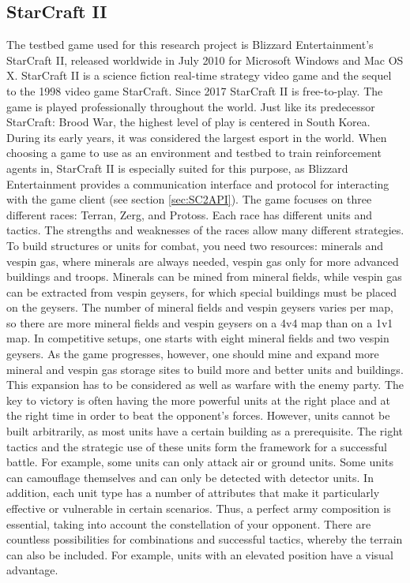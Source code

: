 \documentclass[12pt,a4paper]{article}
\begin{document}
\subsection{StarCraft II}\label{sec:SC2}
The testbed game used for this research project is Blizzard Entertainment's StarCraft II, released worldwide in July 2010 for Microsoft Windows and Mac OS X. StarCraft II is a science fiction real-time strategy video game and the sequel to the 1998 video game StarCraft. Since 2017 StarCraft II is free-to-play. The game is played professionally throughout the world. Just like its predecessor StarCraft: Brood War, the highest level of play is centered in South Korea. During its early years, it was considered the largest esport in the world.
When choosing a game to use as an environment and testbed to train reinforcement agents in, StarCraft II is especially suited for this purpose, as Blizzard Entertainment provides a communication interface and protocol for interacting with the game client (see section \ref{sec:SC2API}).
The game focuses on three different races: Terran, Zerg, and Protoss. Each race has different units and tactics. The strengths and weaknesses of the races allow many different strategies.
To build structures or units for combat, you need two resources: minerals and vespin gas, where minerals are always needed, vespin gas only for more advanced buildings and troops. Minerals can be mined from mineral fields, while vespin gas can be extracted from vespin geysers, for which special buildings must be placed on the geysers. The number of mineral fields and vespin geysers varies per map, so there are more mineral fields and vespin geysers on a 4v4 map than on a 1v1 map.
In competitive setups, one starts with eight mineral fields and two vespin geysers. As the game progresses, however, one should mine and expand more mineral and vespin gas storage sites to build more and better units and buildings. This expansion has to be considered as well as warfare with the enemy party.
The key to victory is often having the more powerful units at the right place and at the right time in order to beat the opponent's forces.
However, units cannot be built arbitrarily, as most units have a certain building as a prerequisite. The right tactics and the strategic use of these units form the framework for a successful battle. For example, some units can only attack air or ground units. Some units can camouflage themselves and can only be detected with detector units. In addition, each unit type has a number of attributes that make it particularly effective or vulnerable in certain scenarios. Thus, a perfect army composition is essential, taking into account the constellation of your opponent. There are countless possibilities for combinations and successful tactics, whereby the terrain can also be included. For example, units with an elevated position have a visual advantage.
\end{document}
